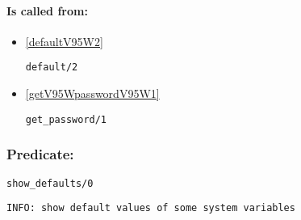 \paragraph{Is called from:} 
\begin{itemize}
\item \ref{defaultV95W2} 
\begin{verbatim}
default/2
\end{verbatim}

\item \ref{getV95WpasswordV95W1} 
\begin{verbatim}
get_password/1
\end{verbatim}

\end{itemize}

\subsubsection{Predicate:} \label{showV95WdefaultsV95W0}

\begin{verbatim}
show_defaults/0
\end{verbatim}

{\small \begin{verbatim}
INFO: show default values of some system variables

\end{verbatim}}
